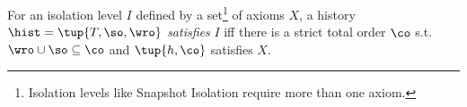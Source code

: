 \begin{definition}
For an isolation level $I$ defined by a set\footnote{Isolation levels like Snapshot Isolation require more than one axiom.} of axioms $X$, a history $\hist=\tup{T, \so, \wro}$ \emph{satisfies} $I$ iff there is a strict total order $\co$ s.t. $\wro\cup\so\subseteq \co$ and $\tup{h,\co}$ satisfies $X$.
 \label{axiom-criterion}
\end{definition}







